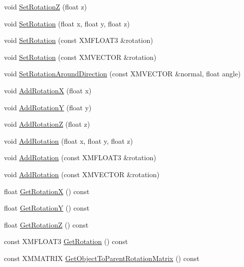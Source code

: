 \begin{DoxyCompactItemize}
void \hyperlink{classmage_1_1_transform_node_a8977f1c3b822398e449d9042a5e3cee0}{Set\+RotationZ} (float z)
\item 
void \hyperlink{classmage_1_1_transform_node_a1f0f355c51e906eabc6aa2a17706ac50}{Set\+Rotation} (float x, float y, float z)
\item 
void \hyperlink{classmage_1_1_transform_node_ad963be51dc37adf84e1e4e19d8afc676}{Set\+Rotation} (const X\+M\+F\+L\+O\+A\+T3 \&rotation)
\item 
void \hyperlink{classmage_1_1_transform_node_a28a438e0170bacc82c8426f167dac6e4}{Set\+Rotation} (const X\+M\+V\+E\+C\+T\+OR \&rotation)
\item 
void \hyperlink{classmage_1_1_transform_node_a36661d441998e1db4ada5f7c8f34155b}{Set\+Rotation\+Around\+Direction} (const X\+M\+V\+E\+C\+T\+OR \&normal, float angle)
\item 
void \hyperlink{classmage_1_1_transform_node_a149a1873d1496075e5f227b686343e5c}{Add\+RotationX} (float x)
\item 
void \hyperlink{classmage_1_1_transform_node_a23af3e48d4d330678199773eb5343215}{Add\+RotationY} (float y)
\item 
void \hyperlink{classmage_1_1_transform_node_acd425b01721efb584c43840cd41486fb}{Add\+RotationZ} (float z)
\item 
void \hyperlink{classmage_1_1_transform_node_ab916a99f686d7a6cab72892668039ec7}{Add\+Rotation} (float x, float y, float z)
\item 
void \hyperlink{classmage_1_1_transform_node_a15d15c00f2e43282d6bcb70cbad3027b}{Add\+Rotation} (const X\+M\+F\+L\+O\+A\+T3 \&rotation)
\item 
void \hyperlink{classmage_1_1_transform_node_ad153cec9663261a3c8cf37a84ebd7082}{Add\+Rotation} (const X\+M\+V\+E\+C\+T\+OR \&rotation)
\item 
float \hyperlink{classmage_1_1_transform_node_a2b3d032c45a0de8d128db83664d85111}{Get\+RotationX} () const
\item 
float \hyperlink{classmage_1_1_transform_node_ab8e8e698297793281a7c880bdcde3880}{Get\+RotationY} () const
\item 
float \hyperlink{classmage_1_1_transform_node_a7cbb269851eb512b19d3b1c0004d7148}{Get\+RotationZ} () const
\item 
const X\+M\+F\+L\+O\+A\+T3 \hyperlink{classmage_1_1_transform_node_a59853c7e8a8cd049a8e6362986204409}{Get\+Rotation} () const
\item 
const X\+M\+M\+A\+T\+R\+IX \hyperlink{classmage_1_1_transform_node_ae72c1a89c45d21458e897522b0ae6842}{Get\+Object\+To\+Parent\+Rotation\+Matrix} () const

\end{DoxyCompactItemize}
